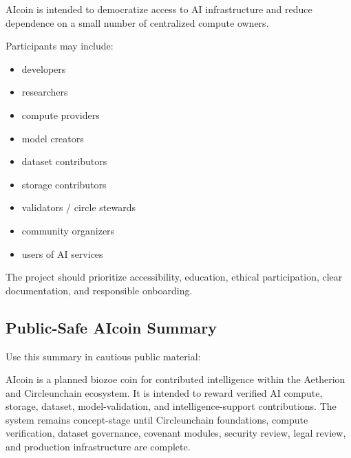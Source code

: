 ﻿\documentclass[12pt]{article}
\begin{document}
AIcoin is intended to democratize access to AI infrastructure and reduce dependence on a small number of centralized compute owners.

Participants may include:

\begin{itemize}
  \item developers
\end{itemize}
\begin{itemize}
  \item researchers
\end{itemize}
\begin{itemize}
  \item compute providers
\end{itemize}
\begin{itemize}
  \item model creators
\end{itemize}
\begin{itemize}
  \item dataset contributors
\end{itemize}
\begin{itemize}
  \item storage contributors
\end{itemize}
\begin{itemize}
  \item validators / circle stewards
\end{itemize}
\begin{itemize}
  \item community organizers
\end{itemize}
\begin{itemize}
  \item users of AI services
\end{itemize}

The project should prioritize accessibility, education, ethical participation, clear documentation, and responsible onboarding.

\subsection{Public-Safe AIcoin Summary}


Use this summary in cautious public material:

AIcoin is a planned biozoe coin for contributed intelligence within the Aetherion and Circleunchain ecosystem. It is intended to reward verified AI compute, storage, dataset, model-validation, and intelligence-support contributions. The system remains concept-stage until Circleunchain foundations, compute verification, dataset governance, covenant modules, security review, legal review, and production infrastructure are complete.
\end{document}
